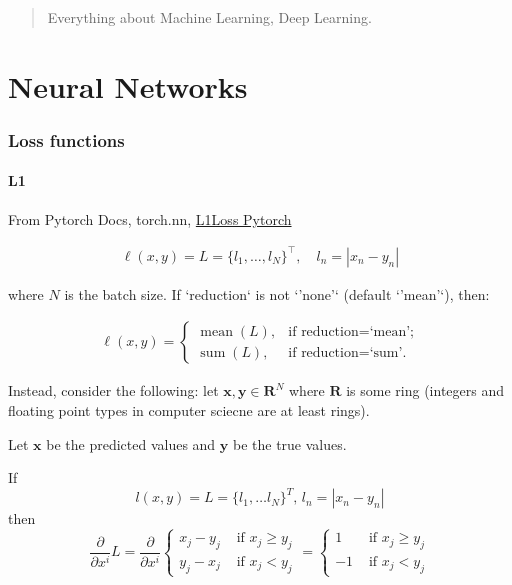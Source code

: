 \documentclass[10pt]{amsart}
\begin{document}
\begin{multicols*}{2}

\begin{abstract}
Everything about Machine Learning, Deep Learning.  
\end{abstract}

\part{Neural Networks}

\section{Loss functions}

\subsection{L1}

From Pytorch Docs, torch.nn,
\href{https://pytorch.org/docs/stable/generated/torch.nn.L1Loss.html#torch.nn.L1Loss}{L1Loss Pytorch}

\[
\begin{gathered}
	\ell(x, y) = L = \{l_1,\dots,l_N\}^\top, \quad
	l_n = \left| x_n - y_n \right|
\end{gathered}
\]
	
	where \( N \) is the batch size. If `reduction` is not `'none'`
	(default `'mean'`), then:

\[
\begin{gathered}	
	\ell(x, y) =
	\begin{cases}
		\operatorname{mean}(L), & \text{if reduction} = \text{`mean';}\\
		\operatorname{sum}(L),  & \text{if reduction} = \text{`sum'.}
	\end{cases}
\end{gathered}
\]

Instead, consider the following: let $\mathbf{x}, \mathbf{y} \in \mathbf{R}^N$ where $\mathbf{R}$ is some ring (integers and floating point types in computer sciecne are at least rings).

Let $\mathbf{x}$ be the predicted values and $\mathbf{y}$ be the true values.

If 
\[
l(x,y) = L = \lbrace l_1, \dots l_N \rbrace^T, \, l_n = |x_n - y_n|
\]
then
\[
\frac{\partial }{ \partial x^i} L = \frac{\partial}{\partial x^i} \begin{cases} x_j - y_j & \text{ if } x_j \geq y_j \\ y_j -x_j & \text{ if } x_j < y_j \end{cases} = \begin{cases} 1 & \text{ if } x_j \geq y_j \\ -1 & \text{ if } x_j < y_j \end{cases}
\]


\end{multicols*}
\end{document}
